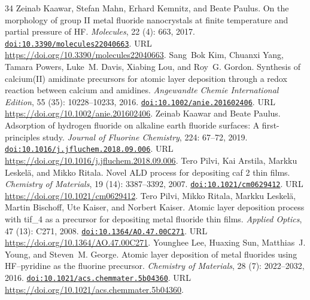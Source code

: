 \documentclass[11pt,a4paper]{article}
\theoremstyle{plain}
\theoremstyle{definition}
\theoremstyle{remark}
\providecommand{\doi}[1]{\href{https://doi.org/#1}{\texttt{doi:#1}}}
\begin{document}
\begin{thebibliography}{34}
Zeinab Kaawar, Stefan Mahn, Erhard Kemnitz, and Beate Paulus.
\newblock On the morphology of group {II} metal fluoride nanocrystals at finite
  temperature and partial pressure of {HF}.
\newblock \emph{Molecules}, 22 (4): 663, 2017.
\newblock \doi{10.3390/molecules22040663}.
\newblock URL \url{https://doi.org/10.3390/molecules22040663}.
Sang~Bok Kim, Chuanxi Yang, Tamara Powers, Luke~M. Davis, Xiabing Lou, and
  Roy~G. Gordon.
\newblock Synthesis of calcium({II}) amidinate precursors for atomic layer
  deposition through a redox reaction between calcium and amidines.
\newblock \emph{Angewandte Chemie International Edition}, 55
  (35): 10228--10233, 2016.
\newblock \doi{10.1002/anie.201602406}.
\newblock URL \url{https://doi.org/10.1002/anie.201602406}.
Zeinab Kaawar and Beate Paulus.
\newblock Adsorption of hydrogen fluoride on alkaline earth fluoride surfaces:
  A first-principles study.
\newblock \emph{Journal of Fluorine Chemistry}, 224: 67--72, 2019.
\newblock \doi{10.1016/j.jfluchem.2018.09.006}.
\newblock URL \url{https://doi.org/10.1016/j.jfluchem.2018.09.006}.
Tero Pilvi, Kai Arstila, Markku Leskelä, and Mikko Ritala.
\newblock Novel {ALD} process for depositing caf 2 thin films.
\newblock \emph{Chemistry of Materials}, 19 (14): 3387--3392,
  2007.
\newblock \doi{10.1021/cm0629412}.
\newblock URL \url{https://doi.org/10.1021/cm0629412}.
Tero Pilvi, Mikko Ritala, Markku Leskelä, Martin Bischoff, Ute Kaiser, and
  Norbert Kaiser.
\newblock Atomic layer deposition process with tif\_4 as a precursor for
  depositing metal fluoride thin films.
\newblock \emph{Applied Optics}, 47 (13): C271, 2008.
\newblock \doi{10.1364/AO.47.00C271}.
\newblock URL \url{https://doi.org/10.1364/AO.47.00C271}.
Younghee Lee, Huaxing Sun, Matthias~J. Young, and Steven~M. George.
\newblock Atomic layer deposition of metal fluorides using {HF}–pyridine as
  the fluorine precursor.
\newblock \emph{Chemistry of Materials}, 28 (7): 2022--2032,
  2016.
\newblock \doi{10.1021/acs.chemmater.5b04360}.
\newblock URL \url{https://doi.org/10.1021/acs.chemmater.5b04360}.

\end{thebibliography}
\end{document}
